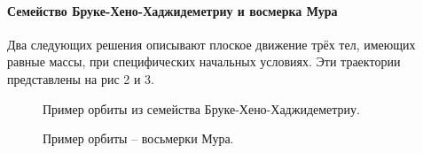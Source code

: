 \documentclass[a4paper, 12pt]{article}%
\begin{document}
\paragraph{Семейство Бруке-Хено-Хаджидеметриу и восмерка Мура}
Два следующих решения описывают плоское движение трёх тел, имеющих равные массы, при специфических начальных условиях. Эти траектории представлены на рис 2 и 3.
\begin{figure}[h!]
\caption{Пример орбиты из семейства Бруке-Хено-Хаджидеметриу.}
\end{figure}

\begin{figure}[h!]
\caption{Пример орбиты -- восьмерки Мура.}
\end{figure}
\end{document}
